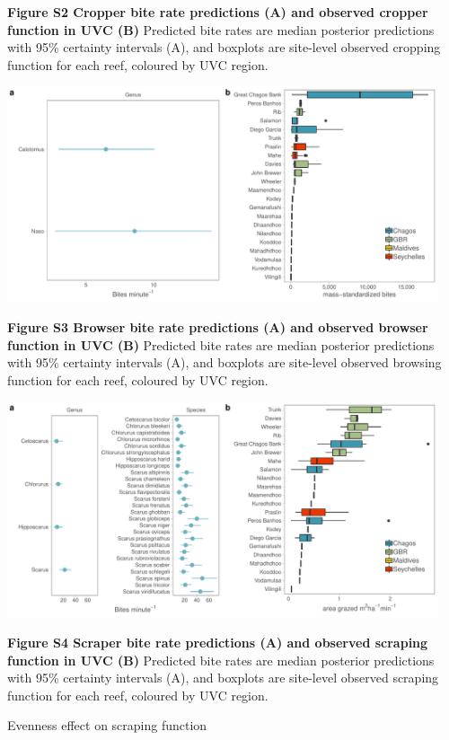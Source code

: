 \documentclass[12pt,]{article}
\begin{document}
\textbf{Figure S2 \textbar{} Cropper bite rate predictions (A) and
observed cropper function in UVC (B)} Predicted bite rates are median
posterior predictions with 95\% certainty intervals (A), and boxplots
are site-level observed cropping function for each reef, coloured by UVC
region.

\newpage

\begin{center}\includegraphics[width=480px]{../../figures/FigureS3_browser_bites} \end{center}

\textbf{Figure S3 \textbar{} Browser bite rate predictions (A) and
observed browser function in UVC (B)} Predicted bite rates are median
posterior predictions with 95\% certainty intervals (A), and boxplots
are site-level observed browsing function for each reef, coloured by UVC
region.

\newpage

\begin{center}\includegraphics[width=480px]{../../figures/FigureS4_scraper_bites} \end{center}

\textbf{Figure S4 \textbar{} Scraper bite rate predictions (A) and
observed scraping function in UVC (B)} Predicted bite rates are median
posterior predictions with 95\% certainty intervals (A), and boxplots
are site-level observed scraping function for each reef, coloured by UVC
region.

\newpage

Evenness effect on scraping function
\end{document}
